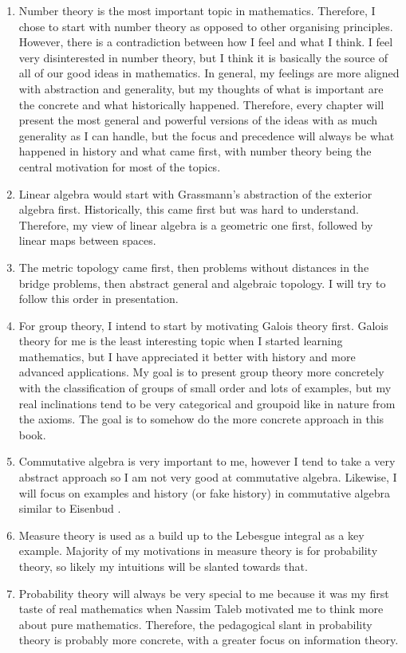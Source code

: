 \documentclass{tufte-book}
\begin{document}
\begin{enumerate}
  \item Number theory is the most important topic in mathematics. Therefore, I chose to start with number theory as opposed to other organising principles. However, there is a contradiction between how I feel and what I think. I feel very disinterested in number theory, but I think it is basically the source of all of our good ideas in mathematics. In general, my feelings are more aligned with abstraction and generality, but my thoughts of what is important are the concrete and what historically happened. Therefore, every chapter will present the most general and powerful versions of the ideas with as much generality as I can handle, but the focus and precedence will always be what happened in history and what came first, with number theory being the central motivation for most of the topics.
  \item Linear algebra would start with Grassmann's abstraction of the exterior algebra first. Historically, this came first but was hard to understand. Therefore, my view of linear algebra is a geometric one first, followed by linear maps between spaces.
  \item The metric topology came first, then problems without distances in the bridge problems, then abstract general and algebraic topology. I will try to follow this order in presentation.
  \item For group theory, I intend to start by motivating Galois theory first. Galois theory for me is the least interesting topic when I started learning mathematics, but I have appreciated it better with history and more advanced applications. My goal is to present group theory more concretely with the classification of groups of small order and lots of examples, but my real inclinations tend to be very categorical and groupoid like in nature from the axioms. The goal is to somehow do the more concrete approach in this book.
  \item Commutative algebra is very important to me, however I tend to take a very abstract approach so I am not very good at commutative algebra. Likewise, I will focus on examples and history (or fake history) in commutative algebra similar to Eisenbud \cite{Eisenbud2004}.
  \item Measure theory is used as a build up to the Lebesgue integral as a key example. Majority of my motivations in measure theory is for probability theory, so likely my intuitions will be slanted towards that.
  \item Probability theory will always be very special to me because it was my first taste of real mathematics when Nassim Taleb motivated me to think more about pure mathematics. Therefore, the pedagogical slant in probability theory is probably more concrete, with a greater focus on information theory.

\end{enumerate}
\end{document}
